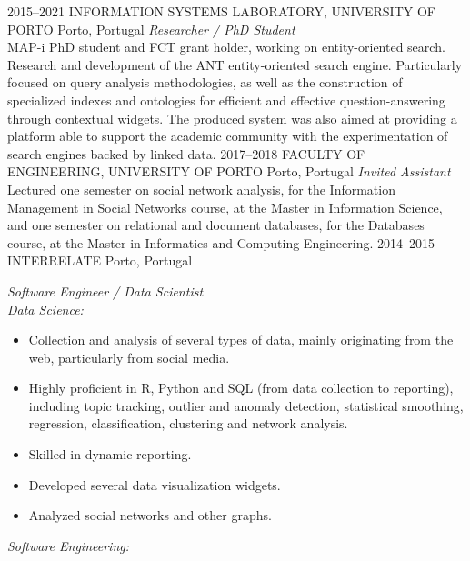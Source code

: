 \documentclass{friggeri-cv}
\begin{document}
\begin{entrylist}
\entry
{2015--2021}
{INFORMATION SYSTEMS LABORATORY, UNIVERSITY OF PORTO}
{Porto, Portugal}
{\emph{Researcher / PhD Student}\\
MAP-i PhD student and FCT grant holder, working on entity-oriented search. Research and development of the ANT entity-oriented search engine. Particularly focused on query analysis methodologies, as well as the construction of specialized indexes and ontologies for efficient and effective question-answering through contextual widgets. The produced system was also aimed at providing a platform able to support the academic community with the experimentation of search engines backed by linked data.}
\entry
{2017--2018}
{FACULTY OF ENGINEERING, UNIVERSITY OF PORTO}
{Porto, Portugal}
{\emph{Invited Assistant}\\
Lectured one semester on social network analysis, for the Information Management in Social Networks course, at the Master in Information Science, and one semester on relational and document databases, for the Databases course, at the Master in Informatics and Computing Engineering.}
\entry
{2014--2015}
{INTERRELATE}
{Porto, Portugal}
{\emph{Software Engineer / Data Scientist}\\[0.3em]
{\normalsize \emph{Data Science:}}
\vspace{0.175em}
{\normalsize \begin{itemize}
  \setlength\itemsep{.0175em}
  \item Collection and analysis of several types of data, mainly originating from the web, particularly from social media.
  \item Highly proficient in R, Python and SQL (from data collection to reporting), including topic tracking, outlier and anomaly detection, statistical smoothing, regression, classification, clustering and network analysis.
  \item Skilled in dynamic reporting.
  \item Developed several data visualization widgets.
  \item Analyzed social networks and other graphs.
\end{itemize}}
\vspace{0.3em}
{\normalsize \emph{Software Engineering:}}
\vspace{0.175em}
{\normalsize \begin{itemize}

\end{itemize}}}
\end{entrylist}
\end{document}
